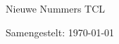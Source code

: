 \documentclass[10pt,a4paper,twoside]{article}
\begin{document}
\begin{center}
\Huge{Nieuwe Nummers TCL}
\end{center}
\vspace*{\fill}
\tableofcontents
\vspace{1em}
\hfill\small{Samengestelt: \today} 





% 
% 
% 
% 
% 
% 
% 
% 
\end{document}
